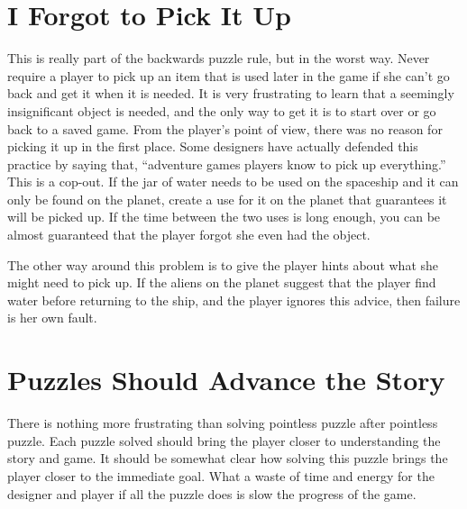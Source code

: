 \documentclass[12pt,letterpaper]{article}
\begin{document}
\section*{I Forgot to Pick It Up} This is really part of the backwards puzzle
rule, but in the worst way. Never require a player to pick up an item that is
used later in the game if she can't go back and get it when it is needed. It is
very frustrating to learn that a seemingly insignificant object is needed, and
the only way to get it is to start over or go back to a saved game. From the
player's point of view, there was no reason for picking it up in the first
place. Some designers have actually defended this practice by saying that,
``adventure games players know to pick up everything.'' This is a cop-out. If the
jar of water needs to be used on the spaceship and it can only be found on the
planet, create a use for it on the planet that guarantees it will be picked up.
If the time between the two uses is long enough, you can be almost guaranteed
that the player forgot she even had the object.

The other way around this problem is to give the player hints about what she
might need to pick up. If the aliens on the planet suggest that the player find
water before returning to the ship, and the player ignores this advice, then
failure is her own fault.

\section*{Puzzles Should Advance the Story} There is nothing more frustrating
than solving pointless puzzle after pointless puzzle. Each puzzle solved should
bring the player closer to understanding the story and game. It should be
somewhat clear how solving this puzzle brings the player closer to the
immediate goal. What a waste of time and energy for the designer and player if
all the puzzle does is slow the progress of the game.
\end{document}
